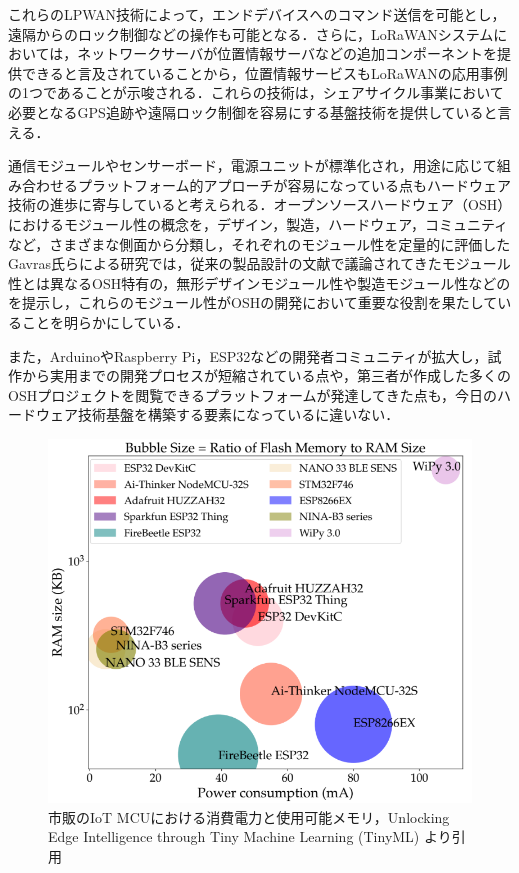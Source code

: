           \par これらのLPWAN技術によって，エンドデバイスへのコマンド送信を可能とし，遠隔からのロック制御などの操作も可能となる．さらに，LoRaWANシステムにおいては，ネットワークサーバが位置情報サーバなどの追加コンポーネントを提供できると言及されていることから，位置情報サービスもLoRaWANの応用事例の1つであることが示唆される．これらの技術は，シェアサイクル事業において必要となるGPS追跡や遠隔ロック制御を容易にする基盤技術を提供していると言える．
          \par 通信モジュールやセンサーボード，電源ユニットが標準化され，用途に応じて組み合わせるプラットフォーム的アプローチが容易になっている点もハードウェア技術の進歩に寄与していると考えられる．オープンソースハードウェア（OSH）におけるモジュール性の概念を，デザイン，製造，ハードウェア，コミュニティなど，さまざまな側面から分類し，それぞれのモジュール性を定量的に評価したGavras氏らによる研究では，従来の製品設計の文献で議論されてきたモジュール性とは異なるOSH特有の，無形デザインモジュール性や製造モジュール性などのを提示し，これらのモジュール性がOSHの開発において重要な役割を果たしていることを明らかにしている．
          \par また，ArduinoやRaspberry Pi，ESP32などの開発者コミュニティが拡大し，試作から実用までの開発プロセスが短縮されている点や，第三者が作成した多くのOSHプロジェクトを閲覧できるプラットフォームが発達してきた点も，今日のハードウェア技術基盤を構築する要素になっているに違いない．

          \begin{figure}[htbp]
            \centering
            \includegraphics[scale=0.4]
            {figures/powerConsumption.png}
            \caption{市販のIoT MCUにおける消費電力と使用可能メモリ，Unlocking Edge Intelligence through Tiny Machine Learning (TinyML) より引用}
            \label{fig:市販のIoT MCUにおける消費電力と使用可能メモリ}
          \end{figure}
      
